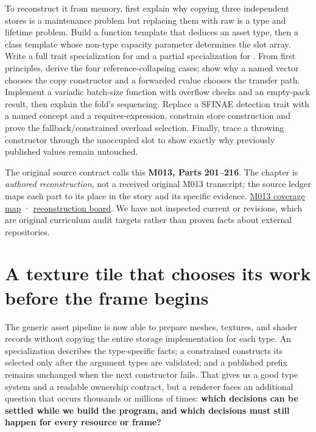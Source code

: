 To reconstruct it from memory, first explain why copying three independent stores is a maintenance problem but replacing them with raw  is a type and lifetime problem. Build a function template that deduces an asset type, then a class template whose non-type capacity parameter determines the slot array. Write a full trait specialization for  and a partial specialization for . From first principles, derive the four reference-collapsing cases; show why a named vector chooses the copy constructor and a forwarded rvalue chooses the transfer path. Implement a variadic batch-size function with overflow checks and an empty-pack result, then explain the fold's sequencing. Replace a SFINAE detection trait with a named concept and a requires-expression, constrain store construction and prove the fallback/constrained overload selection. Finally, trace a throwing constructor through the unoccupied slot to show exactly why previously published values remain untouched.

The original source contract calls this \textbf{M013, Parts 201--216}. The chapter is \emph{authored reconstruction}, not a received original M013 transcript; the source ledger maps each part to its place in the story and its specific evidence. \hyperref[appendix-fd090d982a15-m013-parts-201216-generic-asset-preparation-with-constrained-apis]{M013 coverage map} · \hyperref[appendix-960160274237-one-asset-pipeline-many-types-m013-retrieval]{reconstruction board}. We have not inspected current  or  revisions, which are original curriculum audit targets rather than proven facts about external repositories.

\section{A texture tile that chooses its work before the frame begins}\label{05-engine-i-ch005-a-texture-tile-that-chooses-its-work-before-the-frame-begins}

\hypertarget{05-engine-i-ch005-a-texture-tile-that-chooses-its-work-before-the-frame-begins}{}

The generic asset pipeline is now able to prepare meshes, textures, and shader records without copying the entire storage implementation for each type. An  specialization describes the type-specific facts; a constrained  constructs its selected  only after the argument types are validated; and a published prefix remains unchanged when the next constructor fails. That gives us a good type system and a readable ownership contract, but a renderer faces an additional question that occurs thousands or millions of times: \textbf{which decisions can be settled while we build the program, and which decisions must still happen for every resource or frame?}

